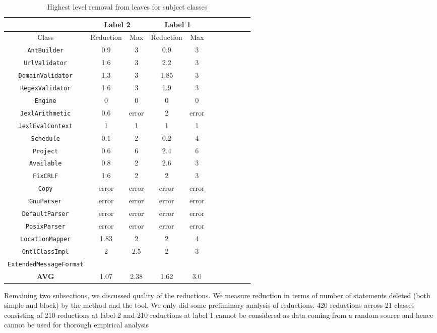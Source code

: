 
\begin{table*}
\begin{center}
\begin{tabular}{|c||c|c|c|c|c||c|c|c|c|c|}
\hline
\hline
& \multicolumn{2}{|c|}{Label 2} & \multicolumn{2}{|c|}{Label 1} \\
\hline
Class & Reduction & Max & Reduction & Max  \\
\hline
\hline
{\tt AntBuilder} & 0.9 & 3 & 0.9 & 3  \\
\hline
{\tt UrlValidator} & 1.6 & 3 & 2.2 & 3  \\
\hline
{\tt DomainValidator} & 1.3 & 3 & 1.85 & 3 \\
\hline
{\tt RegexValidator} & 1.6 & 3 & 1.9 & 3 \\
\hline
{\tt Engine} & 0 & 0 & 0 & 0 \\
\hline
{\tt JexlArithmetic} & 0.6 & error & 2 & error \\ 
\hline
{\tt JexlEvalContext} & 1 & 1 & 1 & 1 \\
\hline
{\tt Schedule} & 0.1 & 2 & 0.2 & 4 \\
\hline
{\tt Project} & 0.6 & 6 & 2.4 & 6 \\
\hline
{\tt Available} & 0.8 & 2 & 2.6 & 3 \\
\hline
{\tt FixCRLF} & 1.6 & 2 & 2 & 3 \\
\hline
{\tt Copy} & error & error & error & error\\
\hline
{\tt GnuParser} & error & error & error & error \\
\hline
{\tt DefaultParser} & error & error & error & error \\
\hline
{\tt PosixParser} & error & error & error & error \\
\hline

{\tt LocationMapper} & 1.83 & 2 & 2 & 4\\
\hline
{\tt OntlClassImpl} & 2 & 2.5 & 2 & 3 \\
\hline
{\tt ExtendedMessageFormat} &  &  &  &  \\
\hline
\hline
{\bf AVG} & 1.07 & 2.38 & 1.62 & 3.0  \\
\hline
\hline
\end{tabular}
\end{center}
\caption{Highest level removal from leaves for subject classes}
\label{tab:avgimproved}
\end{table*}


Remaining two subsections, we discussed quality of the reductions. We measure reduction in terms of number of statements deleted (both simple and block) by the method and the tool. We only did some preliminary analysis of reductions. 420 reductions across 21 classes consisting of 210 reductions at label 2 and 210 reductions at label 1 cannot be considered as data coming from a random source and hence cannot be used for thorough empirical analysis

